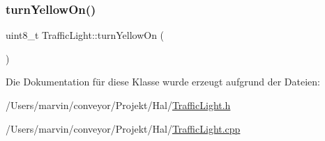 \hypertarget{class_traffic_light_a74b400dafd029a2cfde6c27434111d21}{}\label{class_traffic_light_a74b400dafd029a2cfde6c27434111d21} 
\subsubsection{\texorpdfstring{turn\+Yellow\+On()}{turnYellowOn()}}
{\footnotesize\ttfamily uint8\+\_\+t Traffic\+Light\+::turn\+Yellow\+On (\begin{DoxyParamCaption}{ }\end{DoxyParamCaption})}



Die Dokumentation für diese Klasse wurde erzeugt aufgrund der Dateien\+:\begin{DoxyCompactItemize}
\item 
/\+Users/marvin/conveyor/\+Projekt/\+Hal/\hyperlink{_traffic_light_8h}{Traffic\+Light.\+h}\item 
/\+Users/marvin/conveyor/\+Projekt/\+Hal/\hyperlink{_traffic_light_8cpp}{Traffic\+Light.\+cpp}\end{DoxyCompactItemize}

